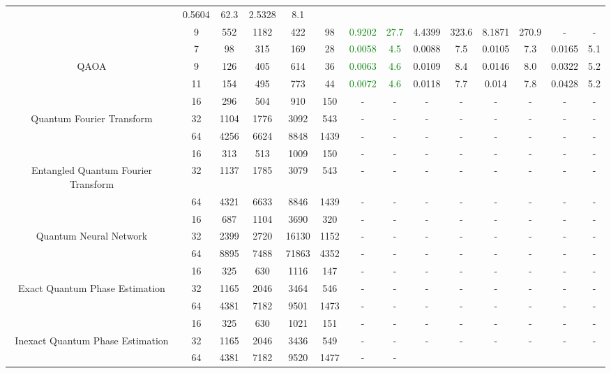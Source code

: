 \begin{table}[htb]
{\begin{tabular}{|c|c|c|c|c|c|c|c|c|c|c|c|c|c|}
 & 0.5604 & 62.3
 & 2.5328 & 8.1
 \\
 & 
9 & 552 & 1182 & 422 & 98
 & \textcolor{green}{0.9202} & \textcolor{green}{27.7}
 & 4.4399 & 323.6
 & 8.1871 & 270.9
 & - & -
 \\
\hline
 & 
7 & 98 & 315 & 169 & 28
 & \textcolor{green}{0.0058} & \textcolor{green}{4.5}
 & 0.0088 & 7.5
 & 0.0105 & 7.3
 & 0.0165 & 5.1
 \\
QAOA & 
9 & 126 & 405 & 614 & 36
 & \textcolor{green}{0.0063} & \textcolor{green}{4.6}
 & 0.0109 & 8.4
 & 0.0146 & 8.0
 & 0.0322 & 5.2
 \\
 & 
11 & 154 & 495 & 773 & 44
 & \textcolor{green}{0.0072} & \textcolor{green}{4.6}
 & 0.0118 & 7.7
 & 0.014 & 7.8
 & 0.0428 & 5.2
 \\
\hline
 & 
16 & 296 & 504 & 910 & 150
 & - & -
 & - & -
 & - & -
 & - & -
 \\
Quantum Fourier Transform & 
32 & 1104 & 1776 & 3092 & 543
 & - & -
 & - & -
 & - & -
 & - & -
 \\
 & 
64 & 4256 & 6624 & 8848 & 1439
 & - & -
 & - & -
 & - & -
 & - & -
 \\
\hline
 & 
16 & 313 & 513 & 1009 & 150
 & - & -
 & - & -
 & - & -
 & - & -
 \\
Entangled Quantum Fourier Transform & 
32 & 1137 & 1785 & 3079 & 543
 & - & -
 & - & -
 & - & -
 & - & -
 \\
 & 
64 & 4321 & 6633 & 8846 & 1439
 & - & -
 & - & -
 & - & -
 & - & -
 \\
\hline
 & 
16 & 687 & 1104 & 3690 & 320
 & - & -
 & - & -
 & - & -
 & - & -
 \\
Quantum Neural Network & 
32 & 2399 & 2720 & 16130 & 1152
 & - & -
 & - & -
 & - & -
 & - & -
 \\
 & 
64 & 8895 & 7488 & 71863 & 4352
 & - & -
 & - & -
 & - & -
 & - & -
 \\
\hline
 & 
16 & 325 & 630 & 1116 & 147
 & - & -
 & - & -
 & - & -
 & - & -
 \\
Exact Quantum Phase Estimation & 
32 & 1165 & 2046 & 3464 & 546
 & - & -
 & - & -
 & - & -
 & - & -
 \\
 & 
64 & 4381 & 7182 & 9501 & 1473
 & - & -
 & - & -
 & - & -
 & - & -
 \\
\hline
 & 
16 & 325 & 630 & 1021 & 151
 & - & -
 & - & -
 & - & -
 & - & -
 \\
Inexact Quantum Phase Estimation & 
32 & 1165 & 2046 & 3436 & 549
 & - & -
 & - & -
 & - & -
 & - & -
 \\
 & 
64 & 4381 & 7182 & 9520 & 1477
 & - & -

\end{tabular}}
\end{table}
